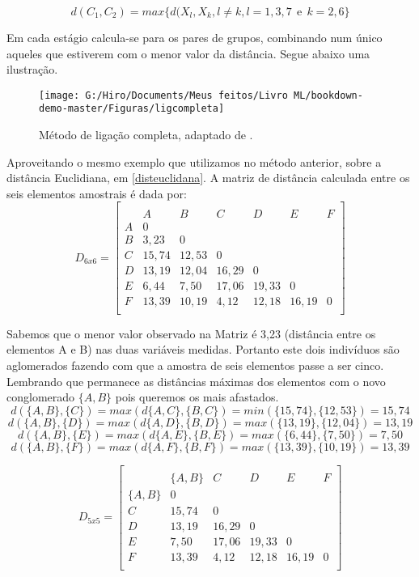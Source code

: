 \documentclass[
  openany]{book}
\begin{document}
\begin{equation}
d(C_1,C_2)=max \{d(X_l,X_k, l\neq k,l=1,3,7 \ \ \mbox{e} \ \ k=2,6\}
 \label{eq:ligcompleta}
\end{equation}

Em cada estágio calcula-se para os pares de grupos, combinando num único aqueles que estiverem com o menor valor da distância. Segue abaixo uma ilustração.

\begin{figure}

{\centering \texttt{[image: G:/Hiro/Documents/Meus feitos/Livro ML/bookdown-demo-master/Figuras/ligcompleta]} 

}

\caption{Método de ligação completa, adaptado de \citet{mingoti2007analise}.}\label{fig:ligcompleta}
\end{figure}



Aproveitando o mesmo exemplo que utilizamos no método anterior, sobre a distância Euclidiana, em \ref{disteuclidana}. A matriz de distância calculada entre os seis elementos amostrais é dada por:
\[D_{6x6}=\begin{bmatrix}\\
 &A&B&C&D&E&F \\
 A&0&&&&&\\
 B&3,23&0&&&&\\
 C & 15,74& 12,53&0&&&\\
 D& 13,19& 12,04& 16,29&0&&\\
 E& 6,44& 7,50& 17,06& 19,33&0&\\
 F& 13,39& 10,19& 4,12& 12,18& 16,19&0 \\
\end{bmatrix}\]

Sabemos que o menor valor observado na Matriz é 3,23 (distância entre os elementos A e B) nas duas variáveis medidas. Portanto este dois indivíduos são aglomerados fazendo com que a amostra de seis elementos passe a ser cinco. Lembrando que permanece as distâncias máximas dos elementos com o novo conglomerado \(\{A,B\}\) pois queremos os mais afastados.
\[d(\{A,B\},\{C\})=max(d\{A,C\},\{B,C\})=min(\{15,74\},\{12,53\})=15,74\]
\[d(\{A,B\},\{D\})=max(d\{A,D\},\{B,D\})=max(\{13,19\},\{12,04\})=13,19\]
\[d(\{A,B\},\{E\})=max(d\{A,E\},\{B,E\})=max(\{6,44\},\{7,50\})=7,50\]
\[d(\{A,B\},\{F\})=max(d\{A,F\},\{B,F\})=max(\{13,39\},\{10,19\})=13,39\]

\[D_{5x5}=\begin{bmatrix}\\
 &\{A,B\}&C&D&E&F \\
 \{A,B\}&0&&&&\\
 C & 15,74&0&&&\\
 D& 13,19& 16,29&0&&\\
 E& 7,50& 17,06& 19,33&0&\\
 F& 13,39& 4,12& 12,18& 16,19&0 \\
\end{bmatrix}\]
\end{document}
